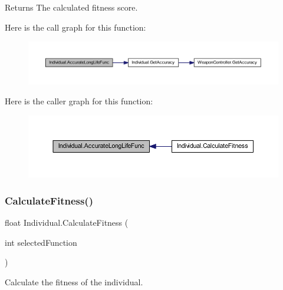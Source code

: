 \begin{DoxyReturn}{Returns}
The calculated fitness score.
\end{DoxyReturn}
Here is the call graph for this function\+:\nopagebreak
\begin{figure}[H]
\begin{center}
\leavevmode
\includegraphics[width=350pt]{class_individual_ae28e091935420b6ab5ccda6ce24e1396_cgraph}
\end{center}
\end{figure}
Here is the caller graph for this function\+:\nopagebreak
\begin{figure}[H]
\begin{center}
\leavevmode
\includegraphics[width=350pt]{class_individual_ae28e091935420b6ab5ccda6ce24e1396_icgraph}
\end{center}
\end{figure}
\mbox{\label{class_individual_a75dd9bebe96f8ff2bad0f60381926085}} 
\subsubsection{\texorpdfstring{Calculate\+Fitness()}{CalculateFitness()}}
{\footnotesize\ttfamily float Individual.\+Calculate\+Fitness (\begin{DoxyParamCaption}\item[{int}]{selected\+Function }\end{DoxyParamCaption})}



Calculate the fitness of the individual. 


